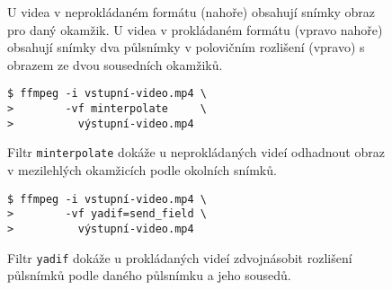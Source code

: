 \begingroup
\begin{subfigure}{\linewidth}

\vspace{-10pt}
\caption{}
\end{subfigure}
%
\par\vspace{10pt}%
\begin{subfigure}[t]{0.49\linewidth}

\caption{U videa v neprokládaném formátu (nahoře) obsahují snímky obraz pro daný okamžik. U videa v prokládaném formátu (vpravo nahoře) obsahují snímky dva půl\-snímky v polovičním rozlišení (vpravo) s obrazem ze dvou sousedních okamžiků.}
\end{subfigure}\hfill
\begin{subfigure}[t]{0.49\linewidth}

\par\vspace{8pt}%

\end{subfigure}
\par\vspace{10pt}%
\begin{subfigure}[t]{0.49\linewidth}
\begin{verbatim}
$ ffmpeg -i vstupní-video.mp4 \
>        -vf minterpolate     \
>          výstupní-video.mp4
\end{verbatim}

\caption{Filtr \texttt{minterpolate} dokáže u neprokládaných videí odhadnout obraz v mezilehlých okamžicích podle okolních snímků.\footnotemark}
\end{subfigure}\hfill
\begin{subfigure}[t]{0.49\linewidth}
\begin{verbatim}
$ ffmpeg -i vstupní-video.mp4 \
>        -vf yadif=send_field \
>          výstupní-video.mp4
\end{verbatim}

\caption{Filtr \texttt{yadif} dokáže u prokládaných videí zdvojnásobit rozlišení půlsnímků podle daného půlsnímku a jeho sousedů.}
\end{subfigure}
\endgroup
